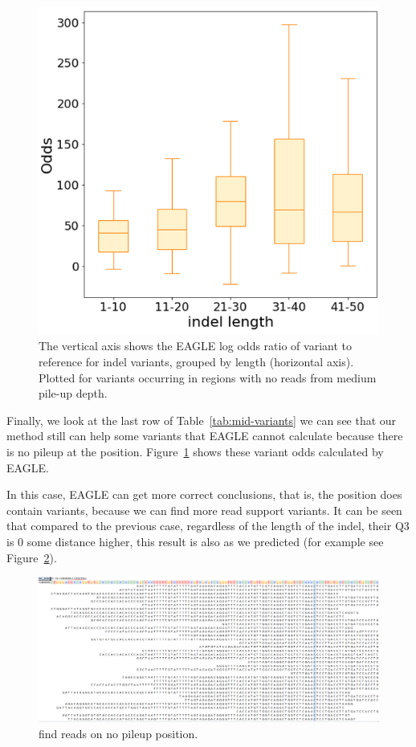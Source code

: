 \begin{figure}[H]
\centering
\includegraphics[width=0.6\columnwidth]{body/image/mid_new_odds.png}
\caption[no reads with variants from medium pile-up depth odds ratio]{The vertical axis shows the EAGLE log odds ratio of variant to reference for indel variants, grouped by length (horizontal axis).  Plotted for variants occurring in regions with no reads from medium pile-up depth.}
\label{mid_new_odds}
\end{figure}


Finally, we look at the last row of Table~\ref{tab:mid-variants} we can see that our method still can help some variants that EAGLE cannot calculate because there is no pileup at the position. Figure~\ref{mid_new_odds} shows these variant odds calculated by EAGLE.

In this case, EAGLE can get more correct conclusions, that is, the position does contain variants, because we can find more read support variants. It can be seen that compared to the previous case, regardless of the length of the indel, their Q3 is 0 some distance higher, this result is also as we predicted (for example see Figure~\ref{mid_new_pileup}).


\begin{figure}[H]
\centering
\includegraphics[width=1\columnwidth]{body/image/mid_new_pileup.png}
\caption[find new pileup reads in medium pile-up read depth]{find reads on no pileup position.}
\label{mid_new_pileup}
\end{figure}

